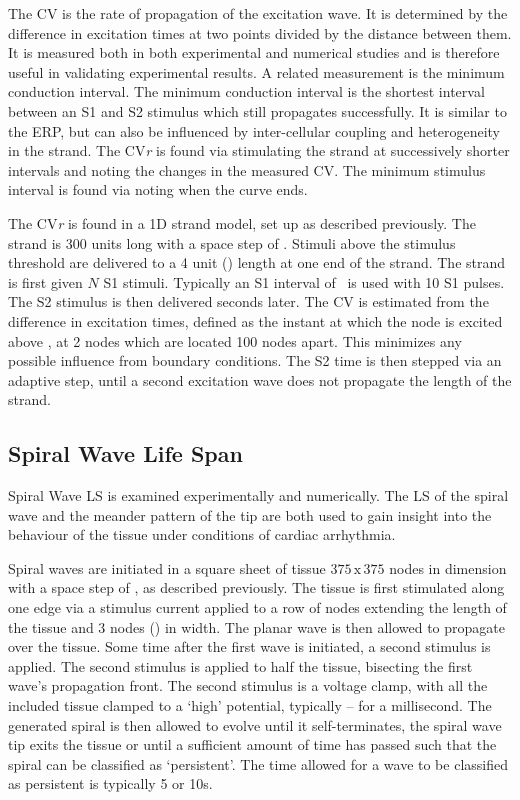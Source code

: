 The CV is the rate of propagation of the excitation wave.
It is determined by the difference in excitation times at two points divided by
the distance between them.
It is measured both in both experimental and numerical studies and is therefore
useful in validating experimental results.
A related measurement is the minimum conduction interval.
The minimum conduction interval is the shortest interval between an S1 and S2
stimulus which still propagates successfully.
It is similar to the ERP, but can also be influenced by inter-cellular coupling
and heterogeneity in the strand.
The CV\emph{r} is found via stimulating the strand at successively shorter
intervals and noting the changes in the measured CV.
The minimum stimulus interval is found via noting when the curve ends.


The CV\emph{r} is found in a 1D strand model, set up as described previously.
The strand is 300 units long with a space step of .
Stimuli above the stimulus threshold are delivered to a 4 unit () length
at one end of the strand.
The strand is first given $N$ S1 stimuli.
Typically an S1 interval of \ is used with 10 S1 pulses.
The S2 stimulus is then delivered  seconds later.
The CV is estimated from the difference in excitation times, defined as the
instant at which the node is excited above , at 2 nodes which are
located 100 nodes apart.
This minimizes any possible influence from boundary conditions.
The S2 time is then stepped via an adaptive step, until a second excitation wave
does not propagate the length of the strand.


\subsection{Spiral Wave Life Span}

Spiral Wave LS is examined experimentally and numerically.  The LS of the spiral
wave and the meander pattern of the tip are both used to gain insight into the
behaviour of the tissue under conditions of cardiac arrhythmia.

Spiral waves are initiated in a square sheet of tissue $375\,\text{x}\,375$
nodes in dimension with a space step of , as described previously.  The
tissue is first stimulated along one edge via a stimulus current applied to a
row of nodes extending the length of the tissue and 3 nodes () in width.
The planar wave is then allowed to propagate over the tissue.  Some time after
the first wave is initiated, a second stimulus is applied.  The second stimulus
is applied to half the tissue, bisecting the first wave's propagation front.
The second stimulus is a voltage clamp, with all the included tissue clamped to
a `high' potential, typically -- for a millisecond.  The
generated spiral is then allowed to evolve until it self-terminates, the spiral
wave tip exits the tissue or until a sufficient amount of time has passed such
that the spiral can be classified as `persistent'.  The time allowed for a wave
to be classified as persistent is typically 5 or \unit{10}{s}.

